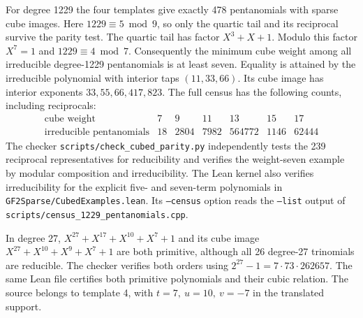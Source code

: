 \documentclass[11pt]{article}
\begin{document}
For degree 1229 the four templates give exactly 478 pentanomials with
sparse cube images. Here \(1229\equiv5\bmod9\), so only the quartic
tail and its reciprocal survive the parity test. The quartic tail
has factor \(X^3+X+1\). Modulo this factor \(X^7=1\) and
\(1229\equiv4\bmod7\). Consequently the minimum cube weight among
all irreducible degree-1229 pentanomials is at least seven. Equality
is attained by the irreducible polynomial with interior taps
\((11,33,66)\). Its cube image has interior exponents
\(33,55,66,417,823\). The full census has the following counts,
including reciprocals:
\[
\begin{array}{c|rrrrrr}
 \text{cube weight}&7&9&11&13&15&17\\\hline
 \text{irreducible pentanomials}&18&2804&7982&564772&1146&62444
\end{array}
\]
The checker \nolinkurl{scripts/check_cubed_parity.py} independently
tests the 239 reciprocal representatives for reducibility and verifies
the weight-seven example by modular composition and irreducibility.
The Lean kernel also verifies irreducibility for the explicit five-
and seven-term polynomials in \nolinkurl{GF2Sparse/CubedExamples.lean}.
Its \texttt{--census} option reads the \texttt{--list} output of
\nolinkurl{scripts/census_1229_pentanomials.cpp}.

In degree 27, \(X^{27}+X^{17}+X^{10}+X^7+1\) and its cube image
\(X^{27}+X^{10}+X^9+X^7+1\) are both primitive, although all 26
degree-27 trinomials are reducible. The checker verifies both orders
using \(2^{27}-1=7\cdot73\cdot262657\). The same Lean file certifies both
primitive polynomials and their cubic relation. The source belongs to
template 4, with \(t=7,\ u=10,\ v=-7\) in the translated support.
\end{document}
